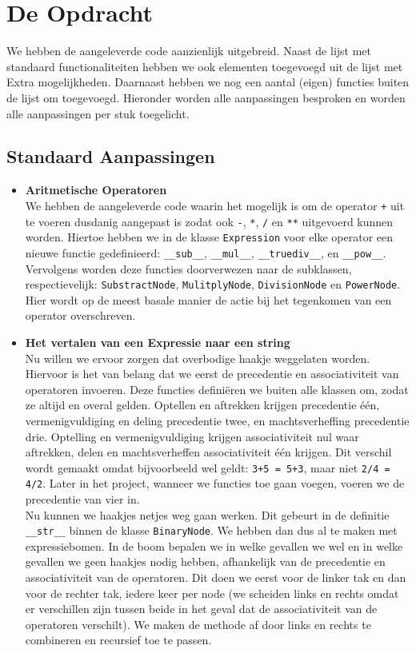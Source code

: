 \documentclass[12pt]{article}
\begin{document}
\section{De Opdracht}
We hebben de aangeleverde code aanzienlijk uitgebreid. Naast de lijst met standaard functionaliteiten hebben we ook elementen toegevoegd uit de lijst met Extra mogelijkheden. Daarnaast hebben we nog een aantal (eigen) functies buiten de lijst om toegevoegd. Hieronder worden alle aanpassingen besproken en worden alle aanpassingen per stuk toegelicht.

\subsection*{Standaard Aanpassingen}
\begin{itemize}
\item \textbf{Aritmetische Operatoren} \\
We hebben de aangeleverde code waarin het mogelijk is om de operator \texttt{+} uit te voeren dusdanig aangepast is zodat ook \texttt{-}, \texttt{*}, \texttt{/} en \texttt{**} uitgevoerd kunnen worden. Hiertoe hebben we in de klasse \texttt{Expression} voor elke operator een nieuwe functie gedefinieerd: \texttt{\_\_sub\_\_}, \texttt{\_\_mul\_\_}, \texttt{\_\_truediv\_\_}, en \texttt{\_\_pow\_\_}. Vervolgens worden deze functies doorverwezen naar de subklassen, respectievelijk: \texttt{SubstractNode}, \texttt{MulitplyNode}, \texttt{DivisionNode} en \texttt{PowerNode}. Hier wordt op de meest basale manier de actie bij het tegenkomen van een operator overschreven.


\item \textbf{Het vertalen van een Expressie naar een string} \\
Nu willen we ervoor zorgen dat overbodige haakje weggelaten worden. Hiervoor is het van belang dat we eerst de precedentie en associativiteit  van operatoren invoeren. Deze functies defini\"eren we buiten alle klassen om, zodat ze altijd en overal gelden. Optellen en aftrekken krijgen precedentie \'e\'en, vermenigvuldiging en deling precedentie twee, en machtsverheffing precedentie drie. Optelling en vermenigvuldiging krijgen associativiteit  nul waar aftrekken, delen en machtsverheffen associativiteit \'e\'en krijgen. Dit verschil wordt gemaakt omdat bijvoorbeeld wel geldt: \texttt{3+5 = 5+3}, maar niet \texttt{2/4 = 4/2}. Later in het project, wanneer we functies toe gaan voegen, voeren we de precedentie van vier in.  \\ \newline
Nu kunnen we haakjes netjes weg gaan werken. Dit gebeurt in de definitie \texttt{\_\_str\_\_} binnen de klasse \texttt{BinaryNode}.  We hebben dan dus al te maken met expressiebomen. In de boom bepalen we in welke gevallen we wel en in welke gevallen we geen haakjes nodig hebben, afhankelijk van de precedentie en associativiteit van de operatoren. Dit doen we eerst voor de linker tak en dan voor de rechter tak, iedere keer per node (we scheiden links en rechts omdat er verschillen zijn tussen beide in het geval dat de associativiteit van de operatoren verschilt). We maken de methode af door links en rechts te combineren en recursief toe te passen.
\end{itemize}
\end{document}
